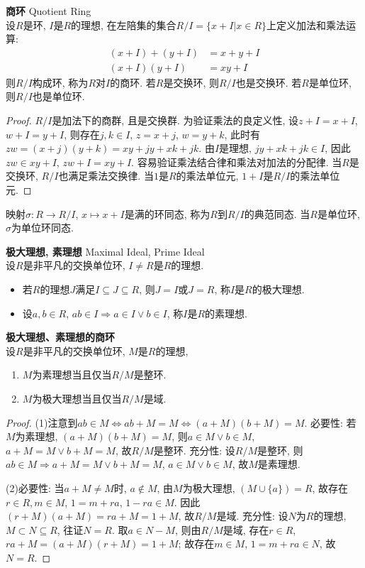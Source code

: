 \begin{pro} \textbf{商环} Quotient Ring\\
设$R$是环, $I$是$R$的理想, 在左陪集的集合$R/I=\{x+I\vert x\in R\}$上定义加法和乘法运算:
\begin{align}
(x+I)+(y+I)&=x+y+I\\
(x+I)(y+I)&=xy+I
\end{align}
则$R/I$构成环, 称为$R$对$I$的商环. 若$R$是交换环, 则$R/I$也是交换环. 若$R$是单位环, 则$R/I$也是单位环. 
\end{pro}
\begin{proof}
$R/I$是加法下的商群, 且是交换群. 为验证乘法的良定义性, 设$z+I=x+I$, $w+I=y+I$, 则存在$j,k \in I$, $z=x+j$, $w=y+k$, 此时有$zw=(x+j)(y+k)=xy+jy+xk+jk$. 由$I$是理想, $jy+xk+jk\in I$, 因此$zw\in xy+I$, $zw+I=xy+I$. 容易验证乘法结合律和乘法对加法的分配律. 当$R$是交换环, $R/I$也满足乘法交换律. 当$1$是$R$的乘法单位元, $1+I$是$R/I$的乘法单位元. 
\end{proof}

映射$\sigma: R\to R/I$, $x \mapsto x+I$是满的环同态, 称为$R$到$R/I$的典范同态. 当$R$是单位环, $\sigma$为单位环同态. 

\begin{dfn} \textbf{极大理想, 素理想} Maximal Ideal, Prime Ideal\\
设$R$是非平凡的交换单位环, $I\neq R$是$R$的理想. 
\begin{itemize}
\item 若$R$的理想$J$满足$I\subseteq J\subseteq R$, 则$J=I$或$J=R$, 称$I$是$R$的极大理想.
\item 设$a,b\in R$, $ab\in I \Rightarrow a\in I \lor b\in I$, 称$I$是$R$的素理想.
\end{itemize}
\end{dfn}

\begin{pro} \textbf{极大理想、素理想的商环}\\
设$R$是非平凡的交换单位环, $M$是$R$的理想, 
\begin{enumerate}
    \item $M$为素理想当且仅当$R/M$是整环. 
    \item $M$为极大理想当且仅当$R/M$是域.
\end{enumerate} 
\end{pro}
\begin{proof}
(1)注意到$ab\in M \iff ab+M=M \iff (a+M)(b+M)=M$. 必要性: 若$M$为素理想, $(a+M)(b+M)=M$, 则$a\in M\lor b\in M$, $a+M=M\lor b+M=M$, 故$R/M$是整环. 充分性: 设$R/M$是整环, 则$ab\in M \Rightarrow a+M=M \lor b+M=M$, $a\in M\lor b\in M$, 故$M$是素理想.

(2)必要性: 当$a+M\neq M$时, $a\notin M$, 由$M$为极大理想, $(M\cup \{a\})=R$, 故存在$r\in R, m\in M$, $1=m+ra$, $1-ra\in M$. 因此$(r+M)(a+M)=ra+M=1+M$, 故$R/M$是域. 充分性: 设$N$为$R$的理想, $M\subset N \subseteq R$, 往证$N=R$. 取$a\in N-M$, 则由$R/M$是域, 存在$r\in R$, $ra+M=(a+M)(r+M)=1+M$; 故存在$m\in M$, $1=m+ra\in N$, 故$N=R$. 
\end{proof}

